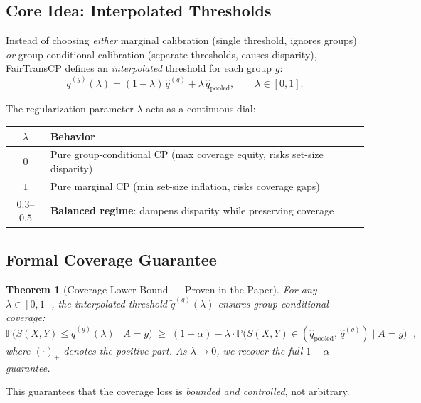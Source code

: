 \documentclass[11pt,a4paper]{article}
\newtheorem{theorem}{Theorem}
\begin{document}
\subsection{Core Idea: Interpolated Thresholds}

Instead of choosing \emph{either} marginal calibration (single threshold, ignores groups) \emph{or} group-conditional calibration (separate thresholds, causes disparity), FairTransCP defines an \emph{interpolated} threshold for each group $g$:
\begin{equation}
\boxed{
\tilde{q}^{(g)}(\lambda) = (1 - \lambda)\,\hat{q}^{(g)} + \lambda\,\hat{q}_{\text{pooled}}, \qquad \lambda \in [0, 1].
}
\label{eq:interpolation}
\end{equation}

The regularization parameter $\lambda$ acts as a continuous dial:

\begin{center}
\small
\begin{tabular}{@{}cl@{}}
\toprule
$\lambda$ & \textbf{Behavior} \\
\midrule
$0$ & Pure group-conditional CP (max coverage equity, risks set-size disparity) \\
$1$ & Pure marginal CP (min set-size inflation, risks coverage gaps) \\
$0.3$--$0.5$ & \textbf{Balanced regime}: dampens disparity while preserving coverage \\
\bottomrule
\end{tabular}
\end{center}

\subsection{Formal Coverage Guarantee}

\begin{theorem}[Coverage Lower Bound --- Proven in the Paper]
For any $\lambda \in [0,1]$, the interpolated threshold $\tilde{q}^{(g)}(\lambda)$ ensures group-conditional coverage:
\[
\mathbb{P}\!\bigl(S(X,Y) \le \tilde{q}^{(g)}(\lambda) \mid A = g\bigr) \;\ge\; (1-\alpha) - \lambda \cdot \mathbb{P}\!\bigl(S(X,Y) \in (\hat{q}_{\text{pooled}},\, \hat{q}^{(g)}) \mid A = g\bigr)_+\!,
\]
where $(\cdot)_+$ denotes the positive part. As $\lambda \to 0$, we recover the full $1-\alpha$ guarantee.
\end{theorem}

This guarantees that the coverage loss is \emph{bounded and controlled}, not arbitrary.
\end{document}
